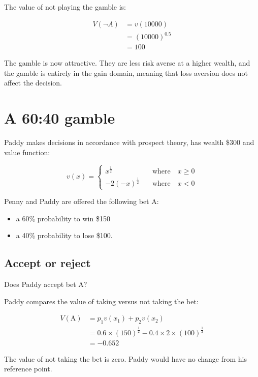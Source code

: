 \documentclass[
  letterpaper,
  DIV=11,
  numbers=noendperiod]{scrreprt}
\providecommand{\tightlist}{%
  \setlength{\itemsep}{0pt}\setlength{\parskip}{0pt}}\usepackage{longtable,booktabs,array}
\begin{document}
The value of not playing the gamble is:

\begin{align*}
V(\neg A)&=v(10000) \\[6pt]
&=(10000)^{0.5} \\[6pt]
&=100
\end{align*}

The gamble is now attractive. They are less risk averse at a higher
wealth, and the gamble is entirely in the gain domain, meaning that loss
aversion does not affect the decision.

\hypertarget{a-6040-gamble-1}{%
\section{A 60:40 gamble}\label{a-6040-gamble-1}}

Paddy makes decisions in accordance with prospect theory, has wealth
\$300 and value function:

\[
v(x)=\left\{\begin{matrix}
x^{\frac{1}{2}} \quad &\textrm{where} \quad x \geq 0 \\
-2(-x)^{\frac{1}{2}} \quad &\textrm{where} \quad x < 0 
\end{matrix}\right.
\]

Penny and Paddy are offered the following bet A:

\begin{itemize}
\tightlist
\item
  a 60\% probability to win \$150
\item
  a 40\% probability to lose \$100.
\end{itemize}

\hypertarget{accept-or-reject-1}{%
\subsection{Accept or reject}\label{accept-or-reject-1}}

Does Paddy accept bet A?

Paddy compares the value of taking versus not taking the bet:

\begin{align*}
V(\text{A})&=p_1v(x_1)+p_2v(x_2) \\
&=0.6\times (150)^{\frac{1}{2}}-0.4\times 2\times (100)^{\frac{1}{2}} \\
&=-0.652
\end{align*}

The value of not taking the bet is zero. Paddy would have no change from
his reference point.
\end{document}
